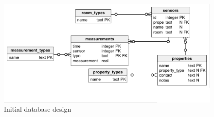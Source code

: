 \documentclass[bsc,frontabs,twoside,singlespacing,parskip,deptreport]{infthesis}
\begin{document}
\begin{figure}
\begin{center}
\centering
\includegraphics[scale=0.6]{initial_db.png}
\caption{\label{sqlinitial}Initial database design}
\end{center}
\end{figure}
\end{document}
